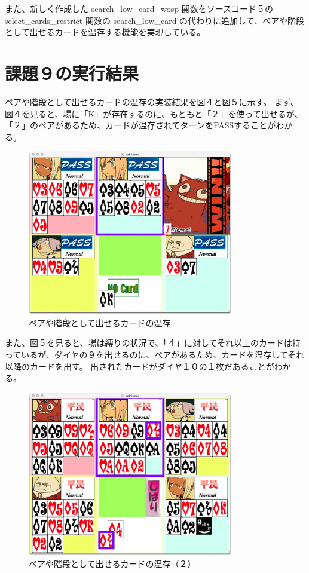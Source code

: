 \documentclass[]{jsarticle}
\begin{document}
また、新しく作成した search\_low\_card\_wosp 関数をソースコード５の select\_cards\_restrict 関数の search\_low\_card の代わりに追加して、ペアや階段として出せるカードを温存する機能を実現している。

\newpage
\section*{課題９の実行結果}
ペアや階段として出せるカードの温存の実装結果を図４と図５に示す。
まず、図４を見ると、場に「K」が存在するのに、もともと「２」を使って出せるが、「２」のペアがあるため、カードが温存されてターンをPASSすることがわかる。
\begin{figure}[h]
  \centering
  \includegraphics[width=0.8\textwidth]{./kadai9onzonpair.jpg}
  \caption{ペアや階段として出せるカードの温存}
\end{figure}

また、図５を見ると、場は縛りの状況で、「４」に対してそれ以上のカードは持っているが、ダイヤの９を出せるのに、ペアがあるため、カードを温存してそれ以降のカードを出す。
出されたカードがダイヤ１０の１枚だあることがわかる。
\begin{figure}[h]
  \centering
  \includegraphics[width=0.8\textwidth]{./kadai9onzonpair2.jpg}
  \caption{ペアや階段として出せるカードの温存（２）}
\end{figure}
\end{document}
